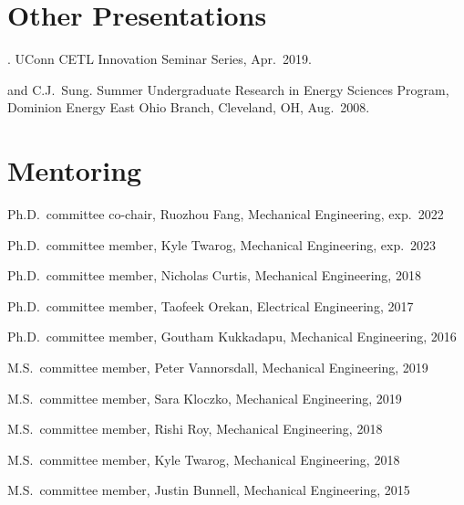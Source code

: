 \section{{\sectionfont Other Presentations}}

\begin{bibmune}
\item {}.  UConn CETL Innovation
      Seminar Series, Apr.\ 2019.

\item {} and C.J.\ Sung.  Summer Undergraduate Research in Energy Sciences Program,
        Dominion Energy East Ohio Branch, Cleveland, OH, Aug.\ 2008.\\
\end{bibmune}

\vspace{\baselineskip}

\section{\sectionfont{} Mentoring}

\begin{lonelist}
\item Ph.D.\ committee co-chair, Ruozhou Fang, Mechanical Engineering, exp.\ 2022
\item Ph.D.\ committee member, Kyle Twarog, Mechanical Engineering, exp.\ 2023
\item Ph.D.\ committee member, Nicholas Curtis, Mechanical Engineering, 2018
\item Ph.D.\ committee member, Taofeek Orekan, Electrical Engineering, 2017
\item Ph.D.\ committee member, Goutham Kukkadapu, Mechanical Engineering, 2016
\item M.S.\ committee member, Peter Vannorsdall, Mechanical Engineering, 2019
\item M.S.\ committee member, Sara Kloczko, Mechanical Engineering, 2019
\item M.S.\ committee member, Rishi Roy, Mechanical Engineering, 2018
\item M.S.\ committee member, Kyle Twarog, Mechanical Engineering, 2018
\item M.S.\ committee member, Justin Bunnell, Mechanical Engineering, 2015
\end{lonelist}

